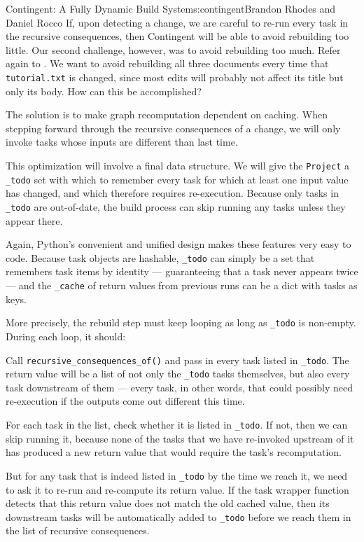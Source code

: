 \begin{aosachapter}{Contingent: A Fully Dynamic Build System}{s:contingent}{Brandon Rhodes and Daniel Rocco}
If, upon detecting a change, we are careful to re-run every task in the
recursive consequences, then Contingent will be able to avoid rebuilding
too little. Our second challenge, however, was to avoid rebuilding too
much. Refer again to . We want to
avoid rebuilding all three documents every time that
\texttt{tutorial.txt} is changed, since most edits will probably not
affect its title but only its body. How can this be accomplished?

The solution is to make graph recomputation dependent on caching. When
stepping forward through the recursive consequences of a change, we will
only invoke tasks whose inputs are different than last time.

This optimization will involve a final data structure. We will give the
\texttt{Project} a \texttt{\_todo} set with which to remember every task
for which at least one input value has changed, and which therefore
requires re-execution. Because only tasks in \texttt{\_todo} are
out-of-date, the build process can skip running any tasks unless they
appear there.

Again, Python's convenient and unified design makes these features very
easy to code. Because task objects are hashable, \texttt{\_todo} can
simply be a set that remembers task items by identity --- guaranteeing
that a task never appears twice --- and the \texttt{\_cache} of return
values from previous runs can be a dict with tasks as keys.

More precisely, the rebuild step must keep looping as long as
\texttt{\_todo} is non-empty. During each loop, it should:

\begin{aosaitemize}
\item
  Call \texttt{recursive\_consequences\_of()} and pass in every task
  listed in \texttt{\_todo}. The return value will be a list of not only
  the \texttt{\_todo} tasks themselves, but also every task downstream
  of them --- every task, in other words, that could possibly need
  re-execution if the outputs come out different this time.
\item
  For each task in the list, check whether it is listed in
  \texttt{\_todo}. If not, then we can skip running it, because none of
  the tasks that we have re-invoked upstream of it has produced a new
  return value that would require the task's recomputation.
\item
  But for any task that is indeed listed in \texttt{\_todo} by the time
  we reach it, we need to ask it to re-run and re-compute its return
  value. If the task wrapper function detects that this return value
  does not match the old cached value, then its downstream tasks will be
  automatically added to \texttt{\_todo} before we reach them in the
  list of recursive consequences.
\end{aosaitemize}


\end{aosachapter}
